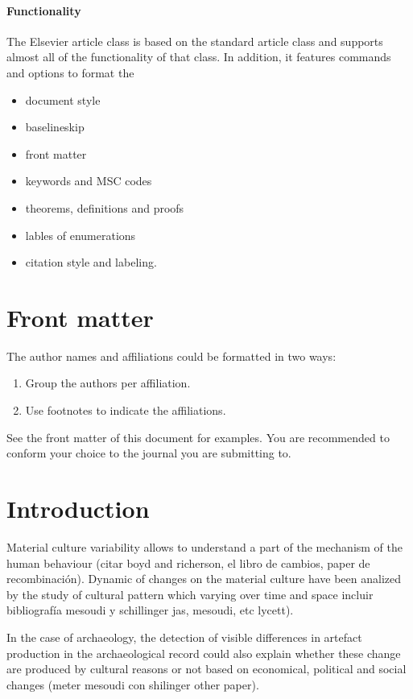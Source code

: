 \documentclass[review]{elsarticle}
\begin{document}
\paragraph{Functionality} The Elsevier article class is based on the standard article class and supports almost all of the functionality of that class. In addition, it features commands and options to format the
\begin{itemize}
\item document style
\item baselineskip
\item front matter
\item keywords and MSC codes
\item theorems, definitions and proofs
\item lables of enumerations
\item citation style and labeling.
\end{itemize}

\section{Front matter}

The author names and affiliations could be formatted in two ways:
\begin{enumerate}[(1)]
\item Group the authors per affiliation.
\item Use footnotes to indicate the affiliations.
\end{enumerate}
See the front matter of this document for examples. You are recommended to conform your choice to the journal you are submitting to.



\section{Introduction}


Material culture variability allows to understand a part of the mechanism of the human behaviour \citep{basalla1988evolution}(citar boyd and richerson, el libro de cambios, paper de recombinación). Dynamic of changes on the material culture have been analized by the study of cultural pattern which varying over time and space \citep{eerkens_jelmer_cultural_2007, lycett_cultural_2015} incluir bibliografía mesoudi y schillinger jas, mesoudi, etc lycett).

In the case of archaeology, the detection of visible differences in artefact production in the archaeological record could also explain whether these change are produced by cultural reasons or not based on economical, political and social changes (meter mesoudi con shilinger other paper).
\end{document}
